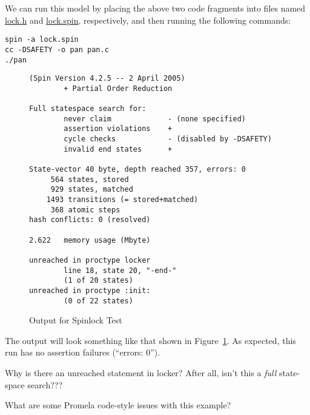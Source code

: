 We can run this model by placing the above two code fragments into
files named \url{lock.h} and \url{lock.spin}, respectively, and then running
the following commands:

\vspace{5pt}
\begin{minipage}[t]{\columnwidth}
\begin{verbatim}
spin -a lock.spin
cc -DSAFETY -o pan pan.c
./pan
\end{verbatim}
\end{minipage}
\vspace{5pt}

\begin{figure}[htbp]
{ \scriptsize
\begin{verbatim}
(Spin Version 4.2.5 -- 2 April 2005)
        + Partial Order Reduction

Full statespace search for:
        never claim             - (none specified)
        assertion violations    +
        cycle checks            - (disabled by -DSAFETY)
        invalid end states      +

State-vector 40 byte, depth reached 357, errors: 0
     564 states, stored
     929 states, matched
    1493 transitions (= stored+matched)
     368 atomic steps
hash conflicts: 0 (resolved)

2.622   memory usage (Mbyte)

unreached in proctype locker
        line 18, state 20, "-end-"
        (1 of 20 states)
unreached in proctype :init:
        (0 of 22 states)
\end{verbatim}
}
\caption{Output for Spinlock Test}
\label{fig:analysis:Output for Spinlock Test}
\end{figure}

The output will look something like that shown in
Figure~\ref{fig:analysis:Output for Spinlock Test}.
As expected, this run has no assertion failures (``errors: 0'').

\QuickQuiz{}
	Why is there an unreached statement in
	locker?  After all, isn't this a \emph{full} state-space
	search???
 \QuickQuizEnd

\QuickQuiz{}
	What are some Promela code-style issues with this example?
 \QuickQuizEnd


